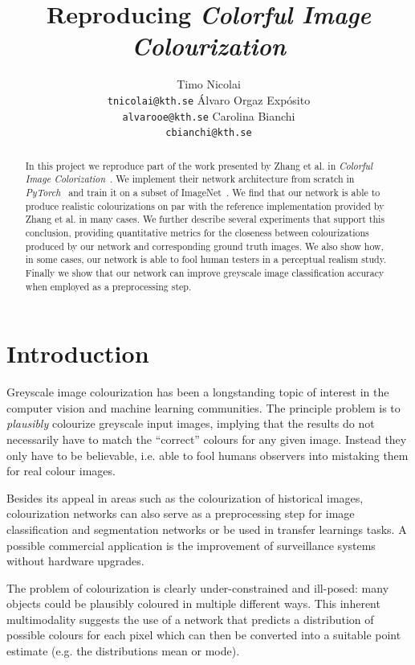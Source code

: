 \documentclass{article}
\title{Reproducing \textit{Colorful Image Colourization}}
\author{%
  Timo Nicolai \\ \texttt{tnicolai@kth.se}
  \And
  Álvaro Orgaz Expósito \\ \texttt{alvarooe@kth.se}
  \And
  Carolina Bianchi \\ \texttt{cbianchi@kth.se}
}
\begin{document}
\maketitle

\begin{abstract}
In this project we reproduce part of the work presented by Zhang et al. in
\textit{Colorful Image Colorization}~\cite{Zhang2016}. We implement their
network architecture from scratch in \textit{PyTorch}~\cite{PyTorch} and train
it on a subset of ImageNet~\cite{ImageNet}. We find that our network is able to
produce realistic colourizations on par with the reference implementation
provided by Zhang et al. in many cases. We further describe several experiments
that support this conclusion, providing quantitative metrics for the closeness
between colourizations produced by our network and corresponding ground truth
images. We also show how, in some cases, our network is able to fool human
testers in a perceptual realism study. Finally we show that our network can
improve greyscale image classification accuracy when employed as a
preprocessing step.
\end{abstract}

\section{Introduction}

Greyscale image colourization has been a longstanding topic of interest in the
computer vision and machine learning communities. The principle problem is to
\textit{plausibly} colourize greyscale input images, implying that the results
do not necessarily have to match the ``correct'' colours for any given image.
Instead they only have to be believable, i.e. able to fool humans observers
into mistaking them for real colour images.

Besides its appeal in areas such as the colourization of historical images,
colourization networks can also serve as a preprocessing step for image
classification and segmentation networks or be used in transfer learnings tasks.
A possible commercial application is the improvement of surveillance systems
without hardware upgrades.

The problem of colourization is clearly under-constrained and ill-posed: many
objects could be plausibly coloured in multiple different ways. This inherent
multimodality suggests the use of a network that predicts a distribution of
possible colours for each pixel which can then be converted into a suitable
point estimate (e.g. the distributions mean or mode).
\end{document}
